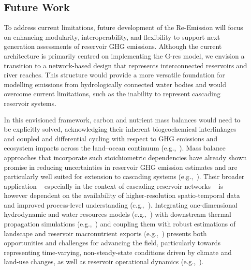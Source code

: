 \documentclass[review, authoryear, 1p]{elsarticle} %
\begin{document}
\subsection{Future Work}
\label{subsec:future_work}

To address current limitations, future development of the Re-Emission will focus on enhancing modularity, interoperability, and flexibility to support next-generation assessments of reservoir \ac{GHG} emissions.
Although the current architecture is primarily centred on implementing the G-res model, we envision a transition to a network-based design that represents interconnected reservoirs and river reaches.
This structure would provide a more versatile foundation for modelling emissions from hydrologically connected water bodies and would overcome current limitations, such as the inability to represent cascading reservoir systems.

In this envisioned framework, carbon and nutrient mass balances would need to be explicitly solved, acknowledging their inherent biogeochemical interlinkages and coupled and differential cycling with respect to \ac{GHG} emissions and ecosystem impacts across the land--ocean continuum (e.g.,~\cite{Nixon2003,Maranger2018,Maavara2020}). 
Mass balance approaches that incorporate such stoichiometric dependencies have already shown promise in reducing uncertainties in reservoir \ac{GHG} emission estimates and are particularly well suited for extension to cascading systems (e.g.,~\cite{Delwiche2022}). 
Their broader application -- especially in the context of cascading reservoir networks -- is however dependent on the availability of higher-resolution spatio-temporal data and improved process-level understanding (e.g.,~\cite{grasset2021empirical}). 
Integrating one-dimensional hydrodynamic and water resources models (e.g.,~\cite{Almeida2022_temperatures}) with downstream thermal propagation simulations (e.g.,~\cite{Long2019_Jinsha,He2025a}) and coupling them with robust estimations of landscape and reservoir macronutrient exports (e.g.,~\cite{He2025b}) presents both opportunities and challenges for advancing the field, particularly towards representing time-varying, non-steady-state conditions driven by climate and land-use changes, as well as reservoir operational dynamics (e.g.,~\cite{Harrison2017}).
\end{document}
